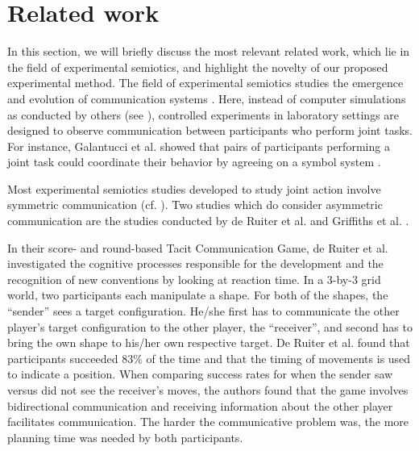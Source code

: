 \section{Related work}

In this section, we will briefly discuss the most relevant related work, which lie in the field of experimental semiotics, and highlight the novelty of our proposed experimental method.
The field of experimental semiotics studies the emergence and evolution of communication systems \cite{galantucci2009experimental}. Here, instead of computer simulations as conducted by others (see \cite{cangelosi2002simulating,steels2012experiments}), controlled experiments in laboratory settings are designed to observe communication between participants who perform joint tasks. For instance, Galantucci et al. showed that pairs of participants performing a joint task could coordinate their behavior by agreeing on a symbol system \cite{galantucci2005experimental}.

Most experimental semiotics studies developed to study joint action involve symmetric communication (cf. \cite{Galantucci2011experimental}).
Two studies which do consider asymmetric communication are the studies conducted by de Ruiter et al. \cite{de2010exploring} and Griffiths et al. \cite{griffiths2012bottom}. 

In their score- and round-based Tacit Communication Game, de Ruiter et al. investigated the cognitive processes responsible for the development and the recognition of new conventions by looking at reaction time. In a 3-by-3 grid world, two participants each manipulate a shape. For both of the shapes, the ``sender'' sees a target configuration. He/she first has to communicate the other player's target configuration to the other player, the ``receiver'', and second has to bring the own shape to his/her own respective target.
De Ruiter et al. found that participants succeeded $83\%$ of the time and that the timing of movements is used to indicate a position. When comparing success rates for when the sender saw versus did not see the receiver's moves, the authors found that the game involves bidirectional communication and receiving information about the other player facilitates communication. The harder the communicative problem was, the more planning time was needed by both participants.

